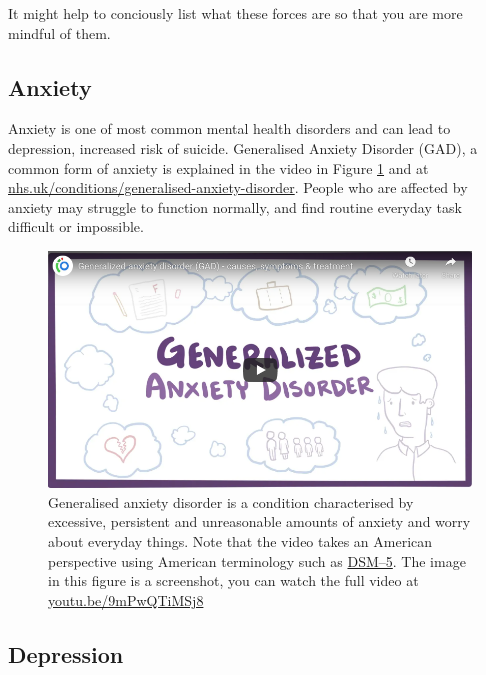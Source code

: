 \documentclass[
]{book}
\begin{document}
It might help to conciously list what these forces are so that you are more mindful of them.

\hypertarget{anxiety}{%
\subsection{Anxiety}\label{anxiety}}

Anxiety is one of most common mental health disorders and can lead to depression, increased risk of suicide. Generalised Anxiety Disorder (GAD), a common form of anxiety is explained in the video in Figure \ref{fig:anxious-fig} and at \href{https://www.nhs.uk/conditions/generalised-anxiety-disorder/}{nhs.uk/conditions/generalised-anxiety-disorder}. People who are affected by anxiety may struggle to function normally, and find routine everyday task difficult or impossible.

\begin{figure}

{\centering \includegraphics[width=0.99\linewidth]{images/youtube-anxiety} 

}

\caption{Generalised anxiety disorder is a condition characterised by excessive, persistent and unreasonable amounts of anxiety and worry about everyday things. Note that the video takes an American perspective using American terminology such as \href{https://www.psychiatry.org/psychiatrists/practice/dsm}{DSM--5}. The image in this figure is a screenshot, you can watch the full video at \href{https://youtu.be/9mPwQTiMSj8}{youtu.be/9mPwQTiMSj8} \citep{youtube-anxiety}}\label{fig:anxious-fig}
\end{figure}



\hypertarget{depression}{%
\subsection{Depression}\label{depression}}
\end{document}
